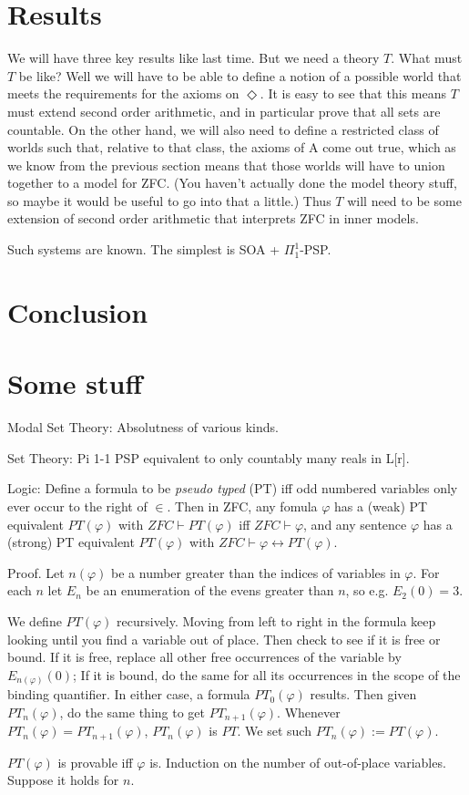 \documentclass{article}
\begin{document}
\section{Results}
We will have three key results like last time. But we need a theory $T$. What must 
$T$ be like? Well we will have to be able to define a notion of a possible world 
that meets the requirements for the axioms on $\Diamond$. It is easy to see that this means 
$T$ must extend second order arithmetic, and in particular prove that all sets are countable. 
On the other hand, we will also need to define a restricted class of worlds such that, 
relative to that class, the axioms of A come out true, which as we know from the previous section 
means that those worlds will have to union together to a model for ZFC. (You haven't 
actually done the model theory stuff, so maybe it would be useful to go into that a 
little.) Thus $T$ will need to be some extension of second order arithmetic that interprets ZFC 
in inner models.

Such systems are known. The simplest is SOA + $\Pi_1^1$-PSP.

\section{Conclusion}
\section{Some stuff}
Modal Set Theory:
Absolutness of various kinds.

Set Theory: 
Pi 1-1 PSP equivalent to only countably many reals in L[r].

Logic: 
Define a formula to be \emph{pseudo typed} (PT) iff 
odd numbered variables only ever occur
to the right of $\in$. 
Then in ZFC, any fomula $\varphi$ has a (weak) PT equivalent
$PT(\varphi)$ with $ZFC \vdash PT(\varphi)$ iff $ZFC \vdash \varphi$, 
and any sentence 
$\varphi$ has a (strong) PT equivalent $PT(\varphi)$ with 
$ZFC \vdash \varphi \leftrightarrow PT(\varphi)$.

Proof. Let $n(\varphi)$ be a number greater than the indices of variables in 
$\varphi$. For each $n$ let $E_n$ be an enumeration of 
the evens greater than $n$, so e.g. $E_2(0)=3$. 

We define $PT(\varphi)$ recursively. Moving from left to right in the formula 
keep looking until you find a variable out of place. Then check to see 
if it is free or bound. If it is free, replace all other free occurrences of the 
variable by $E_{n(\varphi)}(0)$; If 
it is bound, do the same for all its occurrences in the scope 
of the binding quantifier. In either case, a formula $PT_0(\varphi)$
results. Then given $PT_n(\varphi)$, do the same thing to get $PT_{n+1}(\varphi)$.
Whenever $PT_n(\varphi) = PT_{n+1}(\varphi)$, $PT_n(\varphi)$ is $PT$. We set 
such $PT_n(\varphi) := PT(\varphi)$.

$PT(\varphi)$ is provable iff $\varphi$ is. Induction on the number of out-of-place 
variables. Suppose it holds for $n$.
\end{document}
